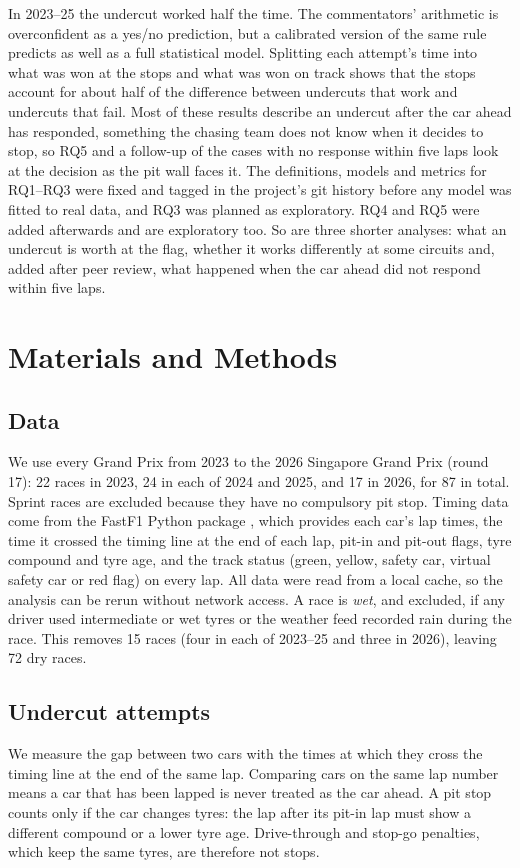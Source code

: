 \documentclass[12pt]{article}
\begin{document}
In 2023--25 the undercut worked half the time. The commentators' arithmetic is overconfident as a yes/no prediction, but a calibrated version of the same rule predicts as well as a full statistical model. Splitting each attempt's time into what was won at the stops and what was won on track shows that the stops account for about half of the difference between undercuts that work and undercuts that fail. Most of these results describe an undercut after the car ahead has responded, something the chasing team does not know when it decides to stop, so RQ5 and a follow-up of the cases with no response within five laps look at the decision as the pit wall faces it. The definitions, models and metrics for RQ1--RQ3 were fixed and tagged in the project's git history before any model was fitted to real data, and RQ3 was planned as exploratory. RQ4 and RQ5 were added afterwards and are exploratory too. So are three shorter analyses: what an undercut is worth at the flag, whether it works differently at some circuits and, added after peer review, what happened when the car ahead did not respond within five laps.

\section{Materials and Methods}

\subsection{Data}
We use every Grand Prix from 2023 to the 2026 Singapore Grand Prix (round 17): 22 races in 2023, 24 in each of 2024 and 2025, and 17 in 2026, for 87 in total. Sprint races are excluded because they have no compulsory pit stop. Timing data come from the FastF1 Python package \citep{fastf1}, which provides each car's lap times, the time it crossed the timing line at the end of each lap, pit-in and pit-out flags, tyre compound and tyre age, and the track status (green, yellow, safety car, virtual safety car or red flag) on every lap. All data were read from a local cache, so the analysis can be rerun without network access. A race is \emph{wet}, and excluded, if any driver used intermediate or wet tyres or the weather feed recorded rain during the race. This removes 15 races (four in each of 2023--25 and three in 2026), leaving 72 dry races.

\subsection{Undercut attempts}
We measure the gap between two cars with the times at which they cross the timing line at the end of the same lap. Comparing cars on the same lap number means a car that has been lapped is never treated as the car ahead. A pit stop counts only if the car changes tyres: the lap after its pit-in lap must show a different compound or a lower tyre age. Drive-through and stop-go penalties, which keep the same tyres, are therefore not stops.
\end{document}
